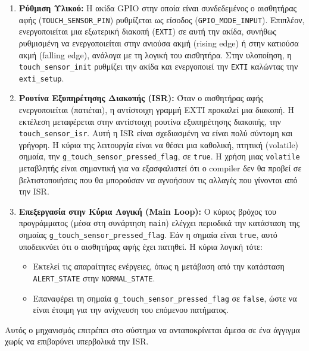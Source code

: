 \documentclass{article}
\begin{document}
\begin{enumerate}
    \item \textbf{Ρύθμιση Υλικού:}
    Η ακίδα GPIO στην οποία είναι συνδεδεμένος ο αισθητήρας αφής (\texttt{TOUCH\_SENSOR\_PIN}) ρυθμίζεται ως είσοδος (\texttt{GPIO\_MODE\_INPUT}). Επιπλέον, ενεργοποιείται μια εξωτερική διακοπή (\texttt{EXTI}) σε αυτή την ακίδα, συνήθως ρυθμισμένη να ενεργοποιείται στην ανιούσα ακμή (rising edge) ή στην κατιούσα ακμή (falling edge), ανάλογα με τη λογική του αισθητήρα. Στην υλοποίηση, η \texttt{touch\_sensor\_init} ρυθμίζει την ακίδα και ενεργοποιεί την \texttt{EXTI} καλώντας την \texttt{exti\_setup}.

    \item \textbf{Ρουτίνα Εξυπηρέτησης Διακοπής (ISR):}
    Όταν ο αισθητήρας αφής ενεργοποιείται (πατιέται), η αντίστοιχη γραμμή EXTI προκαλεί μια διακοπή. Η εκτέλεση μεταφέρεται στην αντίστοιχη ρουτίνα εξυπηρέτησης διακοπής, την \texttt{touch\_sensor\_isr}.
    Αυτή η ISR είναι σχεδιασμένη να είναι πολύ σύντομη και γρήγορη. Η κύρια της λειτουργία είναι να θέσει μια καθολική, πτητική (volatile) σημαία, την \texttt{g\_touch\_sensor\_pressed\_flag}, σε \texttt{true}. Η χρήση μιας \texttt{volatile} μεταβλητής είναι σημαντική για να εξασφαλιστεί ότι ο compiler δεν θα προβεί σε βελτιστοποιήσεις που θα μπορούσαν να αγνοήσουν τις αλλαγές που γίνονται από την ISR.

    \item \textbf{Επεξεργασία στην Κύρια Λογική (Main Loop):}
    Ο κύριος βρόχος του προγράμματος (μέσα στη συνάρτηση \texttt{main}) ελέγχει περιοδικά την κατάσταση της σημαίας \texttt{g\_touch\_sensor\_pressed\_flag}. Εάν η σημαία είναι \texttt{true}, αυτό υποδεικνύει ότι ο αισθητήρας αφής έχει πατηθεί.
    Η κύρια λογική τότε:
    \begin{itemize}
        \item Εκτελεί τις απαραίτητες ενέργειες, όπως η μετάβαση από την κατάσταση \texttt{ALERT\_STATE} στην \texttt{NORMAL\_STATE}.
        \item Επαναφέρει τη σημαία \texttt{g\_touch\_sensor\_pressed\_flag} σε \texttt{false}, ώστε να είναι έτοιμη για την ανίχνευση του επόμενου πατήματος.
    \end{itemize}
\end{enumerate}
Αυτός ο μηχανισμός επιτρέπει στο σύστημα να ανταποκρίνεται άμεσα σε ένα άγγιγμα χωρίς να επιβαρύνει υπερβολικά την ISR.
\bigskip %
\end{document}
